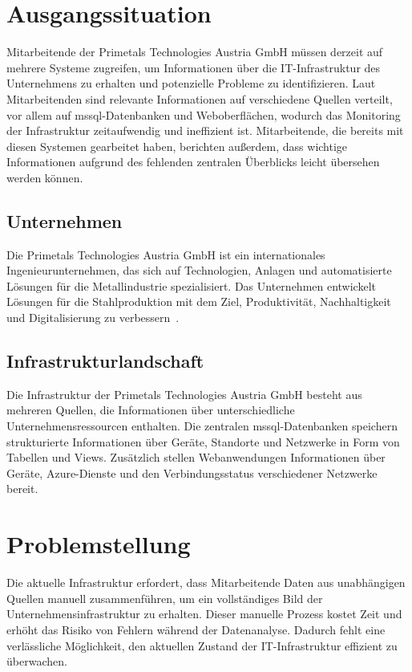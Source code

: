 \section{Ausgangssituation}
\label{sec:inital-situation}

Mitarbeitende der Primetals Technologies Austria GmbH müssen derzeit auf mehrere
Systeme zugreifen, um Informationen über die IT-Infrastruktur des Unternehmens
zu erhalten und potenzielle Probleme zu identifizieren. Laut Mitarbeitenden sind
relevante Informationen auf verschiedene Quellen verteilt, vor allem auf
\gls{mssql}-Datenbanken und Weboberflächen, wodurch das Monitoring der
Infrastruktur zeitaufwendig und ineffizient ist. Mitarbeitende, die bereits mit
diesen Systemen gearbeitet haben, berichten außerdem, dass wichtige Informationen
aufgrund des fehlenden zentralen Überblicks leicht übersehen werden können.

\subsection{Unternehmen}
\label{subsec:primetals-company}

Die Primetals Technologies Austria GmbH ist ein internationales Ingenieurunternehmen,
das sich auf Technologien, Anlagen und automatisierte Lösungen für die Metallindustrie
spezialisiert. Das Unternehmen entwickelt Lösungen für die Stahlproduktion mit dem Ziel,
Produktivität, Nachhaltigkeit und Digitalisierung zu verbessern~\cite{primetals2026}.

\subsection{Infrastrukturlandschaft}
\label{subsec:technical-landscape}

Die Infrastruktur der Primetals Technologies Austria GmbH besteht aus mehreren
Quellen, die Informationen über unterschiedliche Unternehmensressourcen enthalten.
Die zentralen \gls{mssql}-Datenbanken speichern strukturierte Informationen über
Geräte, Standorte und Netzwerke in Form von Tabellen und Views. Zusätzlich stellen
Webanwendungen Informationen über Geräte, Azure-Dienste und den Verbindungsstatus
verschiedener Netzwerke bereit.

\section{Problemstellung}
\label{sec:problem-description}

Die aktuelle Infrastruktur erfordert, dass Mitarbeitende Daten aus unabhängigen
Quellen manuell zusammenführen, um ein vollständiges Bild der Unternehmensinfrastruktur
zu erhalten. Dieser manuelle Prozess kostet Zeit und erhöht das Risiko von Fehlern
während der Datenanalyse. Dadurch fehlt eine verlässliche Möglichkeit, den aktuellen
Zustand der IT-Infrastruktur effizient zu überwachen.

